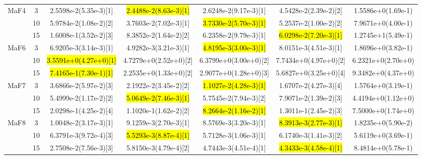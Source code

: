 \documentclass[a4paper,fleqn]{cas-dc}
\newcommand{\highlight}[1]{
	\begingroup
	\sethlcolor{Seashell}%
	\hl{#1}%
	\endgroup
}
\begin{document}
\begin{sloppypar}
\begin{table}[ht]
{\begin{tabular}{ccccccc}
				
				\multirow{3}{*}{MaF4}&3 &2.5598e-2(5.35e-3)[1]	&\highlight{2.4488e-2(8.63e-3)[1]}	&2.6248e-2(9.17e-3)[1]	&4.5428e-2(2.39e-2)[2] &1.5586e+0(1.69e-1)\\
				\multirow{3}{*}{~}&10 &5.9784e-2(1.08e-2)[2]	&3.7603e-2(7.02e-3)[1]	&\highlight{3.7330e-2(5.70e-3)[1]}	&5.2537e-2(1.00e-2)[2]  &7.9671e+0(4.00e-1)\\
				\multirow{3}{*}{~}&15 &1.6008e-1(3.52e-2)[3]	&8.3852e-2(1.64e-2)[2]	&6.2358e-2(9.79e-3)[1]	&\highlight{6.0298e-2(7.20e-3)[1]}  &1.2745e+1(5.49e-1)\\
				\hline
				
				
				
				
				
				
				\multirow{3}{*}{MaF6}&3 &6.9205e-3(3.14e-3)[1]	&4.9282e-3(3.21e-3)[1]	&\highlight{4.8195e-3(3.00e-3)[1]}	&8.0151e-3(4.51e-3)[1] &1.8696e+0(3.82e-1)\\
				\multirow{3}{*}{~}&10  &\highlight{3.5591e+0(4.27e+0)[1]}	&4.7279e+0(2.52e+0)[2]	&6.3799e+0(3.00e+0)[2]	&7.7434e+0(4.97e+0)[2] 	&6.2321e+0(2.70e+0)\\
				\multirow{3}{*}{~}&15  &\highlight{7.4165e-1(7.30e-1)[1]}	&2.2535e+0(1.33e+0)[2]	&2.9077e+0(1.28e+0)[3]	&5.6827e+0(3.25e+0)[4] 	&9.3482e+0(4.37e+0)\\
				\hline
				
				
				
				
				
				\multirow{3}{*}{MaF7}&3 &3.6866e-2(5.97e-2)[3]	&2.1922e-2(3.45e-2)[2]	&\highlight{1.1027e-2(4.28e-3)[1]}	&1.6707e-2(4.27e-3)[4] &1.5764e+0(3.19e-1)\\
				\multirow{3}{*}{~}&10 	&5.4999e-2(1.17e-2)[2]	&\highlight{5.0649e-2(7.46e-3)[1]}	&5.7545e-2(7.94e-3)[2]	&7.9071e-2(1.39e-2)[3] &4.4194e+0(1.12e+0)\\
				\multirow{3}{*}{~}&15  	&2.0298e-1(4.25e-2)[4]	&1.1020e-1(1.62e-2)[2]	&\highlight{8.2664e-2(1.16e-2)[1]}	&1.3011e-1(2.45e-2)[3] &7.5000e+0(1.74e+0)\\
				\hline
				
				
				
				
				\multirow{3}{*}{MaF8}&3 &1.0048e-2(3.17e-3)[1]	&9.1259e-3(2.70e-3)[1]	&8.5769e-3(3.20e-3)[1]	&\highlight{8.3913e-3(2.77e-3)[1]} &1.8235e+0(5.90e-2)\\
				\multirow{3}{*}{~}&10  	&6.3791e-3(9.72e-4)[3]	&\highlight{5.5293e-3(8.87e-4)[1]}	&5.7128e-3(1.06e-3)[1]	&6.1740e-3(1.41e-3)[2] &5.6119e+0(3.69e-1)\\
				\multirow{3}{*}{~}&15  &2.7508e-2(7.56e-3)[3]	&5.8150e-3(4.79e-4)[2]	&4.7443e-3(4.51e-4)[1]	&\highlight{4.3433e-3(4.58e-4)[1]}  &8.4814e+0(5.78e-1)\\
				\hline
				

\end{tabular}}
\end{table}
\end{sloppypar}
\end{document}

